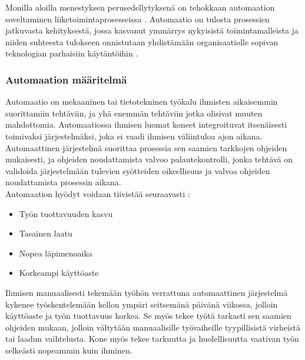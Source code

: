 \documentclass[finnish,12pt,a4paper,pdftex]{article}
\begin{document}
Monilla aloilla menestyksen perusedellytyksenä on tehokkaan automaation soveltaminen liiketoimintaprosesseissa \citep{teollisuustalous}. Automaatio on tulosta prosessien jatkuvasta kehityksestä, jossa kasvanut ymmärrys nykyisistä toimintamalleista ja niiden suhteesta tulokseen onnistutaan yhdistämään organisaatiolle sopivan teknologian parhaisiin käytäntöihin \citep{clarkin}. 




\subsubsection{Automaation määritelmä}

Automaatio on mekaaninen tai tietotekninen työkalu ihmisten aikaisemmin suorittamiin tehtäviin, ja yhä enemmän tehtäviin jotka olisivat muuten mahdottomia. Automaatiossa ihmisen luomat koneet integroituvat itsenäisesti toimivaksi järjestelmäksi, joka ei vaadi ihmisen väliintuloa ajon aikana. Automaattinen järjestelmä suorittaa prosessia sen saamien tarkkojen ohjeiden mukaisesti, ja ohjeiden noudattamista valvoo palautekontrolli, jonka tehtävä on validoida järjestelmään tulevien syötteiden oikeellisuus ja valvoa ohjeiden noudattamista prosessin aikana. \citep{groover} \\

Automaation hyödyt voidaan tiivistää seuraavasti \citep{groover, teollisuustalous}:

\begin{itemize}
\setlength{\itemsep}{0pt}
    \item Työn tuottavuuden kasvu
    \item Tasainen laatu
    \item Nopea läpimenoaika
    \item Korkeampi käyttöaste
\end{itemize}

Ihmisen manuaalisesti tekemään työhön verrattuna automaattinen järjestelmä kykenee työskentelemään kellon ympäri seitsemänä päivänä viikossa, jolloin käyttöaste ja työn tuottavuus korkea. Se myös tekee työtä tarkasti sen saamien ohjeiden mukaan, jolloin vältytään manuaalisille työvaiheille tyypillisistä virheistä tai laadun vaihtelusta. Kone myös tekee tarkuutta ja huolellisuutta vaativan työn selkeästi nopeammin kuin ihminen. \citep{groover}\\
\end{document}
